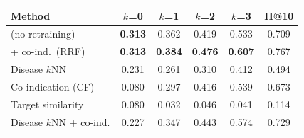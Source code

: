 \begin{tabular}{lccccc}
\toprule
Method & $k$=0 & $k$=1 & $k$=2 & $k$=3 & H@10\\
\midrule
\sysname{} (no retraining) & \textbf{0.313} & 0.362 & 0.419 & 0.533 & 0.709\\
\sysname{} + co-ind.\ (RRF) & \textbf{0.313} & \textbf{0.384} & \textbf{0.476} & \textbf{0.607} & 0.767\\
Disease $k$NN & 0.231 & 0.261 & 0.310 & 0.412 & 0.494\\
Co-indication (CF) & 0.080 & 0.297 & 0.416 & 0.539 & 0.673\\
Target similarity & 0.080 & 0.032 & 0.046 & 0.041 & 0.114\\
Disease $k$NN + co-ind. & 0.227 & 0.347 & 0.443 & 0.574 & 0.729\\
\bottomrule
\end{tabular}